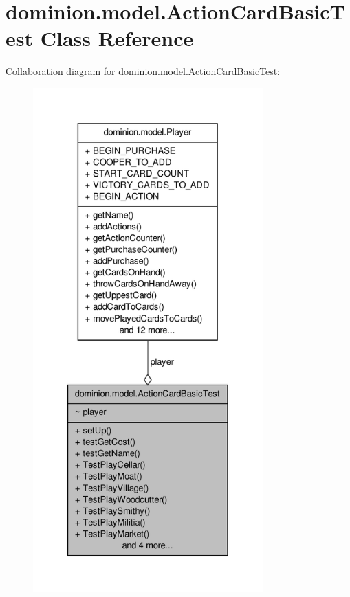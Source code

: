 \hypertarget{classdominion_1_1model_1_1ActionCardBasicTest}{\section{dominion.\-model.\-Action\-Card\-Basic\-Test \-Class \-Reference}
\label{classdominion_1_1model_1_1ActionCardBasicTest}
}


\-Collaboration diagram for dominion.\-model.\-Action\-Card\-Basic\-Test\-:
\nopagebreak
\begin{figure}[H]
\begin{center}
\leavevmode
\includegraphics[height=550pt]{classdominion_1_1model_1_1ActionCardBasicTest__coll__graph}
\end{center}
\end{figure}
